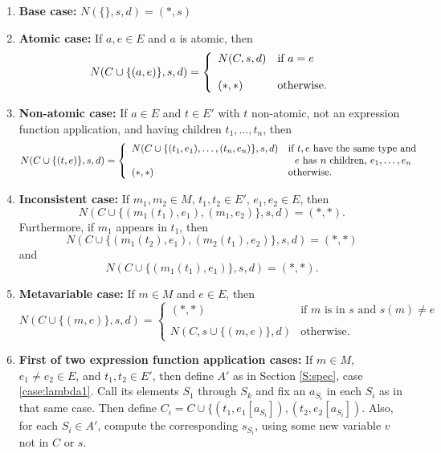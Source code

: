\documentclass{article}
\begin{document}
\begin{enumerate}
\item	{\bf Base case:}
		$N(\{\},s,d)=(*,s)$
\item	{\bf Atomic case:}
		If $a,e\in E$ and $a$ is atomic, then
		$$
			N(C\cup\{(a,e)\},s,d)=\left\{
				\begin{array}{l l}
					N(C,s,d)	& \text{if $a=e$} \\
					& \\
					(*,*)		& \text{otherwise.}
				\end{array}
			\right.
		$$
\item	{\bf Non-atomic case:}
		If $a\in E$ and $t\in E'$ with $t$ non-atomic, not an expression function application, and having children $t_1,\ldots,t_n$, then
		$$
			N(C\cup\{(t,e)\},s,d)=\left\{
				\begin{array}{l l}
					N(C\cup\{(t_1,e_1),\ldots,(t_n,e_n)\},s,d)	&	\text{if $t,e$ have the same type and}	\\
																&	~ ~ \text{$e$ has $n$ children, $e_1,\ldots,e_n$}	\\
					(*,*)										&	\text{otherwise.}
				\end{array}
			\right.
		$$
\item	{\bf Inconsistent case:}
		If $m_1,m_2\in M$, $t_1,t_2\in E'$, $e_1,e_2\in E$, then
		$$	N(C\cup\{(m_1(t_1),e_1),(m_1,e_2)\},s,d)=(*,*).	$$
		Furthermore, if $m_1$ appears in $t_1$, then
		$$	N(C\cup\{(m_1(t_2),e_1),(m_2(t_1),e_2)\},s,d)=(*,*)	$$
		and
		$$	N(C\cup\{(m_1(t_1),e_1)\},s,d)=(*,*).	$$
\item	{\bf Metavariable case:}
		If $m\in M$ and $e\in E$, then
		$$
        	N(C\cup\{(m,e)\},s,d) = \left\{
            	\begin{array}{ll}
                    (*,*)					& \text{if $m$ is in $s$ and $s(m)\neq e$} \\
                    & \\
                    N(C,s\cup\{(m,e)\},d)	& \text{otherwise.}
                \end{array}
            \right.
        $$
\item	{\bf First of two expression function application cases:}
		If $m\in M$, $e_1\neq e_2\in E$, and $t_1,t_2\in E'$, then define $A'$ as in Section \ref{S:spec}, case \ref{case:lambda1}.  Call its elements $S_1$ through $S_k$ and fix an $a_{S_i}$ in each $S_i$ as in that same case.  Then define $C_i=C\cup\{(t_1,e_1[a_{S_i}]),(t_2,e_2[a_{S_i}])$.  Also, for each $S_i\in A'$, compute the corresponding $s_{S_i}$, using some new variable $v$ not in $C$ or $s$.


\end{enumerate}
\end{document}
